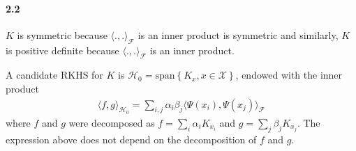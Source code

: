 \documentclass[10pt]{article}
\begin{document}



    \paragraph{2.2} $K$ is symmetric because $\langle., .
    \rangle_\mathcal{F}$ is an inner product is symmetric 
    and similarly, $K$ is positive definite because $\langle., .
    \rangle_\mathcal{F}$ is an inner product.

    A candidate RKHS for $K$ is $\mathcal{H}_0 = \text{span}\left\{ K_x, x\in 
    \mathcal{X}\right\}$, endowed with the inner product 
    \begin{align*}
        \langle f, g \rangle_{\mathcal{H}_0} = \sum_{i,j} \alpha_i \beta_j 
        \langle \Psi(x_i), \Psi(x_j) \rangle_\mathcal{F}
    \end{align*}
    where $f$ and $g$ were decomposed as $f = \sum_i \alpha_i K_{x_i}$ and $g = 
    \sum_j \beta_j K_{x_j}$. The expression above does not depend on the 
    decomposition of $f$ and $g$.
\end{document}
